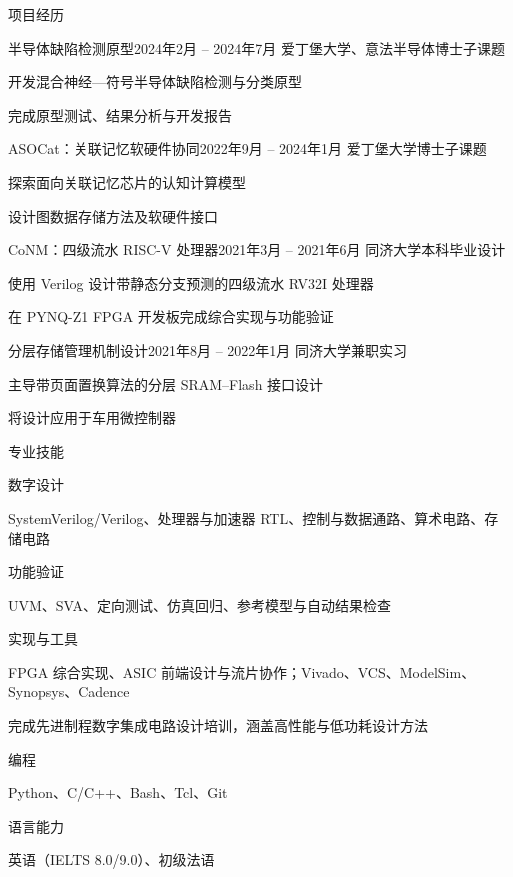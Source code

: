 \documentclass{resume}
\begin{document}
\begin{rSection}{项目经历}
  \begin{rSubsection}{半导体缺陷检测原型}{2024年2月 -- 2024年7月}
    {爱丁堡大学、意法半导体}{博士子课题}
    \item 开发混合神经—符号半导体缺陷检测与分类原型
    \item 完成原型测试、结果分析与开发报告
  \end{rSubsection}

  \begin{rSubsection}{ASOCat：关联记忆软硬件协同}{2022年9月 -- 2024年1月}
    {爱丁堡大学}{博士子课题}
    \item 探索面向关联记忆芯片的认知计算模型
    \item 设计图数据存储方法及软硬件接口
  \end{rSubsection}

  \begin{rSubsection}{CoNM：四级流水 RISC-V 处理器}{2021年3月 -- 2021年6月}
    {同济大学}{本科毕业设计}
    \item 使用 Verilog 设计带静态分支预测的四级流水 RV32I 处理器
    \item 在 PYNQ-Z1 FPGA 开发板完成综合实现与功能验证
  \end{rSubsection}

  \begin{rSubsection}{分层存储管理机制设计}{2021年8月 -- 2022年1月}
    {同济大学}{兼职实习}
    \item 主导带页面置换算法的分层 SRAM--Flash 接口设计
    \item 将设计应用于车用微控制器
  \end{rSubsection}
\end{rSection}

\begin{rSection}{专业技能}
  \begin{rSubsection}{数字设计}{}{}{}
    \item SystemVerilog/Verilog、处理器与加速器 RTL、控制与数据通路、算术电路、存储电路
  \end{rSubsection}
  \begin{rSubsection}{功能验证}{}{}{}
    \item UVM、SVA、定向测试、仿真回归、参考模型与自动结果检查
  \end{rSubsection}
  \begin{rSubsection}{实现与工具}{}{}{}
    \item FPGA 综合实现、ASIC 前端设计与流片协作；Vivado、VCS、ModelSim、Synopsys、Cadence
    \item 完成先进制程数字集成电路设计培训，涵盖高性能与低功耗设计方法
  \end{rSubsection}
  \begin{rSubsection}{编程}{}{}{}
    \item Python、C/C++、Bash、Tcl、Git
  \end{rSubsection}
  \begin{rSubsection}{语言能力}{}{}{}
    \item 英语（IELTS 8.0/9.0）、初级法语
  \end{rSubsection}
\end{rSection}
\end{document}
